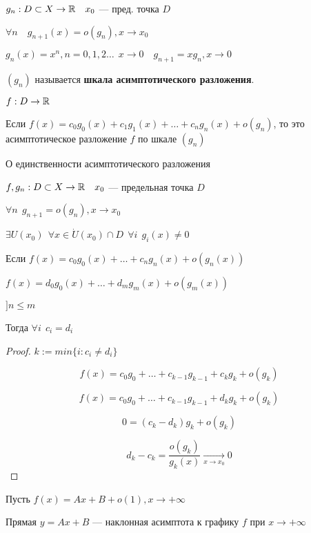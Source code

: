     \begin{definition}
        $g_n:D\subset X\to\mathbb{R} \quad x_0$ --- пред. точка $D$

        $\forall n \quad g_{n+1}(x)=o(g_n), x\to x_0$

        \begin{example}
            $g_n(x)=x^n, n=0,1,2\ldots \ \ x\to 0 \quad g_{n+1}=xg_n, x\to 0$
        \end{example}

        $(g_n)$ называется \textbf{шкала асимптотического разложения}.
        
        $f:D\to\mathbb{R}$
        
        Если $f(x)=c_0g_0(x)+c_1g_1(x)+\ldots+c_ng_n(x)+o(g_n)$, то это асимптотическое разложение $f$ по шкале $(g_n)$
    \end{definition}
    \begin{theorem}
        О единственности асимптотического разложения

        $f, g_n: D\subset X\to \mathbb{R} \quad x_0$ --- предельная точка $D$

        $\forall n \ \ g_{n+1}=o(g_n), x\to x_0$

        $\exists U(x_0) \ \ \forall x\in\dot U(x_0)\cap D \ \ \forall i \ \ g_i(x)\not=0$

        Если $f(x)=c_0g_0(x)+\ldots+c_ng_n(x)+o(g_n(x))$

        $f(x)=d_0g_0(x)+\ldots+d_mg_m(x)+o(g_m(x))$

        $] n\leq m$

        Тогда $\forall i \ \ c_i=d_i$
    \end{theorem}
    \begin{proof}
        $k:=min\{i:c_i\not=d_i\}$

        $$f(x)=c_0g_0+\ldots+c_{k-1}g_{k-1}+c_kg_k+o(g_k)$$

        $$f(x)=c_0g_0+\ldots+c_{k-1}g_{k-1}+d_kg_k+o(g_k)$$

        $$0=(c_k-d_k)g_k+o(g_k)$$

        $$d_k-c_k=\frac{o(g_k)}{g_k(x)}\xrightarrow[x\to x_0]{}0$$
    \end{proof}
    \begin{example}
        Пусть $f(x)=Ax+B+o(1), x\to +\infty$

        Прямая $y=Ax+B$ --- наклонная асимптота к графику $f$ при $x\to +\infty$
    \end{example}
